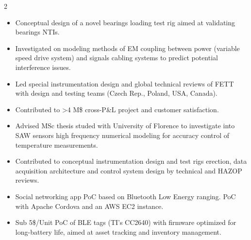 \documentclass[9pt,a4paper,ragged2e,withhyper]{altacv} %
\begin{document}
\begin{paracol}{2}

\begin{itemize}
\item Conceptual design of a novel bearings loading test rig aimed at validating bearings NTIs.
\item Investigated on modeling methods of EM coupling between power (variable speed drive system) and signals cabling systems to predict potential interference issues.
\end{itemize}
\divider

\begin{itemize}
\item Led special instrumentation design and global technical reviews of FETT with design and testing teams (Czech Rep., Poland, USA, Canada).
\item Contributed to >4 M\$ cross-P\&L project and customer satisfaction.
\end{itemize}
\divider

\begin{itemize}
\item Advised MSc thesis studed with University of Florence to investigate into SAW sensors high frequency numerical modeling for accuracy control of temperature measurements.
\end{itemize}
\divider

\begin{itemize}
\item Contributed to conceptual instrumentation design and test rigs erection, data acquisition architecture and control system design by technical and HAZOP reviews.
\end{itemize}
\divider

\begin{itemize}
\item Social networking app PoC based on Bluetooth Low Energy ranging. PoC with Apache Cordova and an AWS EC2 instance.
\end{itemize}
\divider

\begin{itemize}
\item Sub 5\$/Unit PoC of BLE tags (TI's CC2640) with firmware optimized for long-battery life, aimed at asset tracking and inventory management.
\end{itemize}
\divider


\end{paracol}
\end{document}
